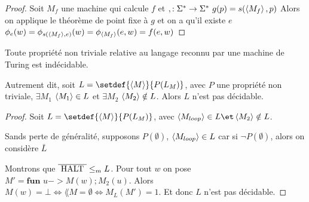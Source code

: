 \begin{proof}
	Soit $M_f$ une machine qui calcule $f$ et $, : \Sigma^{*} \to \Sigma^{*} \ g(p) = s(\left\langle M_f\right\rangle, p)$
	Alors on applique le théorème de point fixe à $g$ et on a qu'il existe $e$ \tq $\phi_e(w)
		=\phi_{s(\left\langle M_f\right\rangle,e)} (w) = \phi_{\left\langle M_f\right\rangle} (e,w) = f(e,w)$
\end{proof}


\begin{theorem}[de Rice]
	Toute propriété non triviale relative au langage reconnu par une machine de Turing est indécidable.

	Autrement dit, soit $L = \setdef {\encode M} {P(L_M)}$, avec $P$ une propriété non triviale, \ie $\exists M_1$ \tq
	$\left\langle M_1\right\rangle \in L$ et $\exists M_2$ \tq $\left\langle M_2\right\rangle \notin L$. Alors $L$ n'est pas décidable.
\end{theorem}


\begin{proof}
	Soit $L = \setdef {\encode M} {P(L_M)}$, avec $\encode {M_{loop}} \in L \et \encode{M_2} \notin L$.

	Sands perte de généralité, supposons $P(\emptyset)$, \ie $\left\langle M_{loop}\right\rangle \in L$ car si
	$\lnot P (\emptyset)$, alors on considère $\bar L$ %

	Montrons que $\overline {\text{ HALT }} \leq_m L$.
	Pour tout $w$ on pose $M' = \textbf{fun } u -> M(w); M_2(u)$. Alors $M(w) = \bot \iff \lang M = \emptyset \iff M_L (M') = 1$.
	Et donc $L$ n'est pas décidable.
\end{proof}


